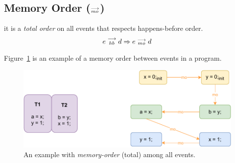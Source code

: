     \subsection{Memory Order ($\stackrel{\longrightarrow}{_{mo}}$)}
        it is a \textit{total order} on all events that respects happens-before order\footnotemark. 
        \begin{align*}
            e\stackrel{\longrightarrow}{_{hb}}d \Rightarrow{} e\stackrel{\longrightarrow}{_{mo}}d    
        \end{align*}

        
        Figure~\ref{model:memory-order} is an example of a memory order between events in a program.
        \begin{figure}[H]
            \centering
            \includegraphics[scale=0.7]{4.ECMAScriptMemoryModel/MemoryOrder.pdf}
            \caption{An example with \textit{memory-order} (total) among all events.}
            \label{model:memory-order}
        \end{figure}
